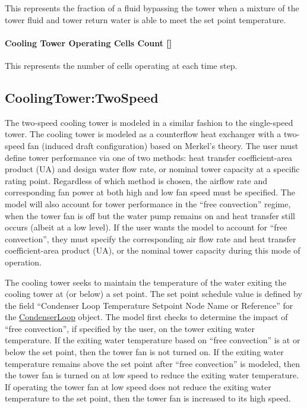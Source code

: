 This represents the fraction of a fluid bypassing the tower when a mixture of the tower fluid and tower return water is able to meet the set point temperature.

\paragraph{Cooling Tower Operating Cells Count {[]}}\label{cooling-tower-operating-cells-count}

This represents the number of cells operating at each time step.

\subsection{CoolingTower:TwoSpeed}\label{coolingtowertwospeed}

The two-speed cooling tower is modeled in a similar fashion to the single-speed tower. The cooling tower is modeled as a counterflow heat exchanger with a two-speed fan (induced draft configuration) based on Merkel's theory. The user must define tower performance via one of two methods: heat transfer coefficient-area product (UA) and design water flow rate, or nominal tower capacity at a specific rating point. Regardless of which method is chosen, the airflow rate and corresponding fan power at both high and low fan speed must be specified. The model will also account for tower performance in the ``free convection'' regime, when the tower fan is off but the water pump remains on and heat transfer still occurs (albeit at a low level). If the user wants the model to account for ``free convection'', they must specify the corresponding air flow rate and heat transfer coefficient-area product (UA), or the nominal tower capacity during this mode of operation.

The cooling tower seeks to maintain the temperature of the water exiting the cooling tower at (or below) a set point. The set point schedule value is defined by the field ``Condenser Loop Temperature Setpoint Node Name or Reference'' for the \hyperref[condenserloop]{CondenserLoop} object. The model first checks to determine the impact of ``free convection'', if specified by the user, on the tower exiting water temperature. If the exiting water temperature based on ``free convection'' is at or below the set point, then the tower fan is not turned on. If the exiting water temperature remains above the set point after ``free convection'' is modeled, then the tower fan is turned on at low speed to reduce the exiting water temperature. If operating the tower fan at low speed does not reduce the exiting water temperature to the set point, then the tower fan is increased to its high speed.

